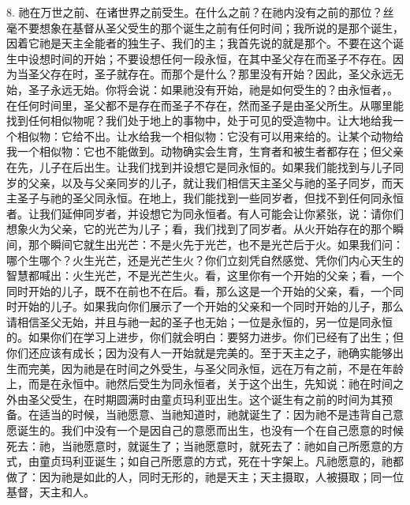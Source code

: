 8. 祂在万世之前、在诸世界之前受生。在什么之前？在祂内没有之前的那位？丝毫不要想象在基督从圣父受生的那个诞生之前有任何时间；我所说的是那个诞生，因着它祂是天主全能者的独生子、我们的主；我首先说的就是那个。不要在这个诞生中设想时间的开始；不要设想任何一段永恒，在其中圣父存在而圣子不存在。因为当圣父存在时，圣子就存在。而那个是什么？那里没有开始？因此，圣父永远无始，圣子永远无始。你将会说：如果祂没有开始，祂是如何受生的？由永恒者，。在任何时间里，圣父都不是存在而圣子不存在，然而圣子是由圣父所生。从哪里能找到任何相似物呢？我们处于地上的事物中，处于可见的受造物中。让大地给我一个相似物：它给不出。让水给我一个相似物：它没有可以用来给的。让某个动物给我一个相似物：它也不能做到。动物确实会生育，生育者和被生者都存在；但父亲在先，儿子在后出生。让我们找到并设想它是同永恒的。如果我们能找到与儿子同岁的父亲，以及与父亲同岁的儿子，就让我们相信天主圣父与祂的圣子同岁，而天主圣子与祂的圣父同永恒。在地上，我们能找到一些同岁者，但找不到任何同永恒者。让我们延伸同岁者，并设想它为同永恒者。有人可能会让你紧张，说：请你们想象火为父亲，它的光芒为儿子；看，我们找到了同岁者。从火开始存在的那个瞬间，那个瞬间它就生出光芒：不是火先于光芒，也不是光芒后于火。如果我们问：哪个生哪个？火生光芒，还是光芒生火？你们立刻凭自然感觉、凭你们内心天生的智慧都喊出：火生光芒，不是光芒生火。看，这里你有一个开始的父亲；看，一个同时开始的儿子，既不在前也不在后。看，那么这是一个开始的父亲，看，一个同时开始的儿子。如果我向你们展示了一个开始的父亲和一个同时开始的儿子，那么请相信圣父无始，并且与祂一起的圣子也无始；一位是永恒的，另一位是同永恒的。如果你们在学习上进步，你们就会明白：要努力进步。你们已经有了出生；但你们还应该有成长；因为没有人一开始就是完美的。至于天主之子，祂确实能够出生而完美，因为祂是在时间之外受生，与圣父同永恒，远在万有之前，不是在年龄上，而是在永恒中。祂然后受生为同永恒者，关于这个出生，先知说：祂在时间之外由圣父受生，在时期圆满时由童贞玛利亚出生。这个诞生有之前的时间为其预备。在适当的时候，当祂愿意、当祂知道时，祂就诞生了：因为祂不是违背自己意愿诞生的。我们中没有一个是因自己的意愿而出生，也没有一个在自己愿意的时候死去：祂，当祂愿意时，就诞生了；当祂愿意时，就死去了：祂如自己所愿意的方式，由童贞玛利亚诞生；如自己所愿意的方式，死在十字架上。凡祂愿意的，祂都做了：因为祂是如此的人，同时无形的，祂是天主；天主摄取，人被摄取；同一位基督，天主和人。\par

